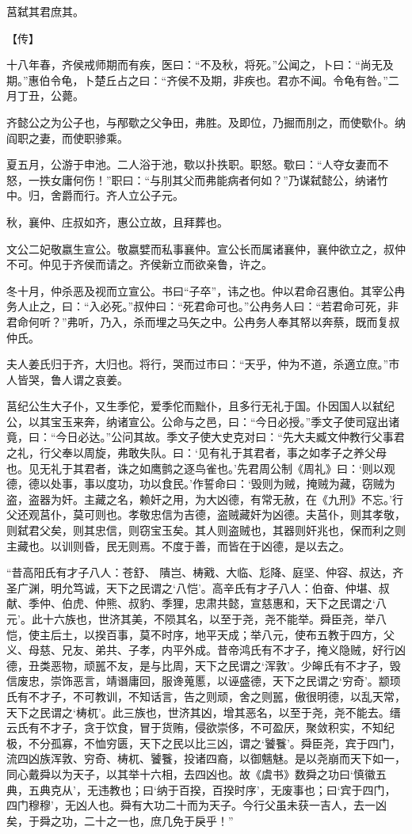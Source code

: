 \documentclass[a4paper,12pt,UTF8,twoside]{ctexbook}
\begin{document}
莒弑其君庶其。

【传】

十八年春，齐侯戒师期而有疾，医曰：“不及秋，将死。”公闻之，卜曰：“尚无及期。”惠伯令龟，卜楚丘占之曰：“齐侯不及期，非疾也。君亦不闻。令龟有咎。”二月丁丑，公薨。

齐懿公之为公子也，与邴歜之父争田，弗胜。及即位，乃掘而刖之，而使歜仆。纳阎职之妻，而使职骖乘。

夏五月，公游于申池。二人浴于池，歜以扑抶职。职怒。歜曰：“人夺女妻而不怒，一抶女庸何伤！”职曰：“与刖其父而弗能病者何如？”乃谋弑懿公，纳诸竹中。归，舍爵而行。齐人立公子元。

秋，襄仲、庄叔如齐，惠公立故，且拜葬也。

文公二妃敬嬴生宣公。敬嬴嬖而私事襄仲。宣公长而属诸襄仲，襄仲欲立之，叔仲不可。仲见于齐侯而请之。齐侯新立而欲亲鲁，许之。

冬十月，仲杀恶及视而立宣公。书曰“子卒”，讳之也。仲以君命召惠伯。其宰公冉务人止之，曰：“入必死。”叔仲曰：“死君命可也。”公冉务人曰：“若君命可死，非君命何听？”弗听，乃入，杀而埋之马矢之中。公冉务人奉其帑以奔蔡，既而复叔仲氏。

夫人姜氏归于齐，大归也。将行，哭而过市曰：“天乎，仲为不道，杀適立庶。”市人皆哭，鲁人谓之哀姜。

莒纪公生大子仆，又生季佗，爱季佗而黜仆，且多行无礼于国。仆因国人以弑纪公，以其宝玉来奔，纳诸宣公。公命与之邑，曰：“今日必授。”季文子使司寇出诸竟，曰：“今日必达。”公问其故。季文子使大史克对曰：“先大夫臧文仲教行父事君之礼，行父奉以周旋，弗敢失队。曰：‘见有礼于其君者，事之如孝子之养父母也。见无礼于其君者，诛之如鹰鹯之逐鸟雀也。’先君周公制《周礼》曰：‘则以观德，德以处事，事以度功，功以食民。’作誓命曰：‘毁则为贼，掩贼为藏，窃贼为盗，盗器为奸。主藏之名，赖奸之用，为大凶德，有常无赦，在《九刑》不忘。’行父还观莒仆，莫可则也。孝敬忠信为吉德，盗贼藏奸为凶德。夫莒仆，则其孝敬，则弑君父矣，则其忠信，则窃宝玉矣。其人则盗贼也，其器则奸兆也，保而利之则主藏也。以训则昏，民无则焉。不度于善，而皆在于凶德，是以去之。

“昔高阳氏有才子八人：苍舒、 隤岂、梼戭、大临、尨降、庭坚、仲容、叔达，齐圣广渊，明允笃诚，天下之民谓之‘八恺’。高辛氏有才子八人：伯奋、仲堪、叔献、季仲、伯虎、仲熊、叔豹、季狸，忠肃共懿，宣慈惠和，天下之民谓之‘八元’。此十六族也，世济其美，不陨其名，以至于尧，尧不能举。舜臣尧，举八恺，使主后土，以揆百事，莫不时序，地平天成；举八元，使布五教于四方，父义、母慈、兄友、弟共、子孝，内平外成。昔帝鸿氏有不才子，掩义隐贼，好行凶德，丑类恶物，顽嚚不友，是与比周，天下之民谓之‘浑敦’。少皞氏有不才子，毁信废忠，崇饰恶言，靖谮庸回，服谗蒐慝，以诬盛德，天下之民谓之‘穷奇’。颛顼氏有不才子，不可教训，不知话言，告之则顽，舍之则嚚，傲很明德，以乱天常，天下之民谓之‘梼杌’。此三族也，世济其凶，增其恶名，以至于尧，尧不能去。缙云氏有不才子，贪于饮食，冒于货贿，侵欲崇侈，不可盈厌，聚敛积实，不知纪极，不分孤寡，不恤穷匮，天下之民以比三凶，谓之‘饕餮’。舜臣尧，宾于四门，流四凶族浑敦、穷奇、梼杌、饕餮，投诸四裔，以御魑魅。是以尧崩而天下如一，同心戴舜以为天子，以其举十六相，去四凶也。故《虞书》数舜之功曰‘慎徽五典，五典克从’，无违教也；曰‘纳于百揆，百揆时序’，无废事也；曰‘宾于四门，四门穆穆’，无凶人也。舜有大功二十而为天子。今行父虽未获一吉人，去一凶矣，于舜之功，二十之一也，庶几免于戾乎！”
\end{document}
